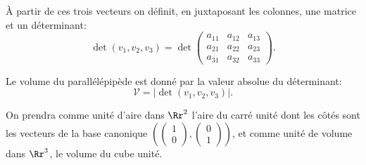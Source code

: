 \documentclass[class=report,crop=false]{standalone}
\begin{document}

\`A partir de ces trois vecteurs on définit, en juxtaposant les colonnes,
une matrice et un déterminant:
\[
\det(v_1,v_2,v_3)=\det
\begin{pmatrix}
a_{11}&a_{12}&a_{13}\\
a_{21}&a_{22}&a_{23}\\
a_{31}&a_{32}&a_{33}
\end{pmatrix}.
\]

\begin{proposition}\label{prop:volume}
Le volume du parallélépipède est donné par la valeur absolue du déterminant:
$$\mathcal{V} = \Big|\det(v_1,v_2,v_3)\Big|.$$
\end{proposition}


On prendra comme unité d'aire dans $\Rr^2$ l'aire du carré unité dont
les côtés sont les vecteurs de la base canonique
$\left(\left(\begin{smallmatrix} 1 \\ 0 \end{smallmatrix} \right),
\left(\begin{smallmatrix} 0 \\ 1 \end{smallmatrix} \right)\right)$,
et comme unité de volume dans $\Rr^3$,
le volume du cube unité.
\end{document}
